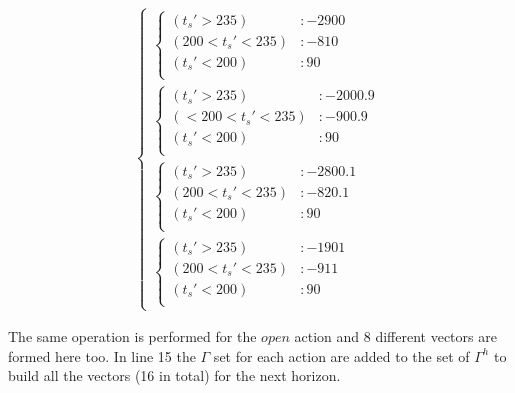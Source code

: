\documentclass{article}
\begin{document}
\begin{align*}
\begin{cases}
\begin{cases}
(t_s'>235) &: -2900 \\
(200<t_s'<235) &: -810 \\
(t_s'<200) &: 90 \\
\end{cases}
\\
\begin{cases}
(t_s'>235) &: -2000.9 \\
(<200<t_s'<235) &: -900.9 \\
(t_s'<200) &: 90 \\
\end{cases}
\\
\begin{cases}
 (t_s'>235) &: -2800.1 \\
 (200<t_s'<235) &: -820.1 \\
 (t_s'<200) &: 90 \\
\end{cases}
\\
\begin{cases}
 (t_s'>235) &: -1901 \\
 (200<t_s'<235) &: -911 \\
 (t_s'<200) &: 90 \\
\end{cases}
\end{cases}
\end{align*}

The same operation is performed for the $open$ action and 8 different vectors are formed here too. In line 15 the $\Gamma$ set for each action are added to the set of $\Gamma^h$ to build all the vectors (16 in total) for the next horizon. 
\end{document}
